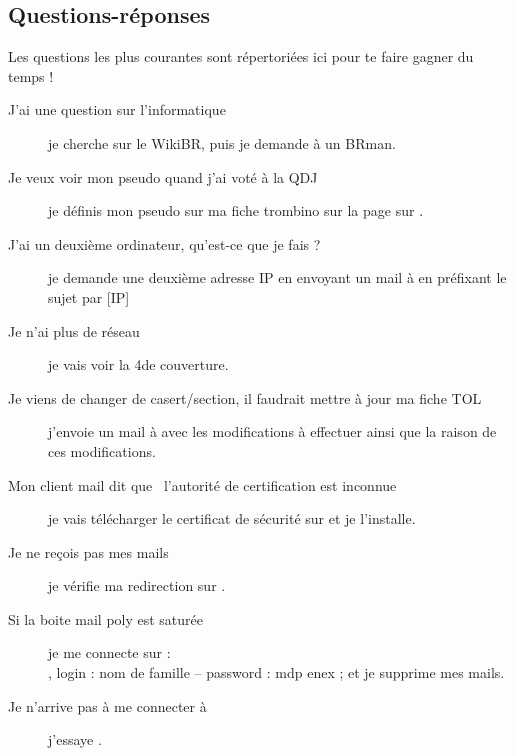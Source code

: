 \subsection{Questions-réponses}

Les questions les plus courantes sont répertoriées ici pour te faire gagner du temps !

\begin{description}

\item[J'ai une question sur l'informatique] je cherche sur le WikiBR, puis je demande \`a un BRman.

\item[Je veux voir mon pseudo quand j'ai voté à la QDJ] je définis mon pseudo sur ma fiche \linebreak trombino sur la page  sur \fkz.

\item[J'ai un deuxième ordinateur, qu'est-ce que je fais ?] je demande une deuxième adresse IP en envoyant un mail à  en préfixant le sujet par [IP] 

\item[Je n'ai plus de réseau] je vais voir la 4\ieme de couverture.

\item[Je viens de changer de casert/section, il faudrait mettre à jour ma fiche TOL] j'envoie un \newline mail à  avec les modifications à effectuer ainsi que la raison de ces
modifications.

\item[Mon client mail dit que \guillemotleft~l'autorité de certification est inconnue~\guillemotright ] je vais télécharger le certificat de sécurité sur  et je l'installe.

\item[Je ne reçois pas mes mails] je vérifie ma redirection sur .

\item[Si la boite mail poly est saturée] je me connecte sur :\\
, 
login : nom de famille --
password : mdp enex ; et je supprime mes mails.


\item[Je n'arrive pas à me connecter à ] j'essaye .


\end{description}
